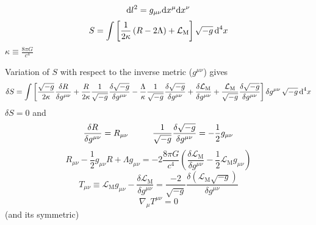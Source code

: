 \begin{equation}
	\text{d} l^2=g_{\mu\nu}\text{d} x^\mu\text{d} x^\nu
\end{equation}
\begin{equation}
	S=\int\left[\frac{1}{2\kappa}\left(R-2\Lambda\right)+\mathcal{L}_{\text{M}}\right]\sqrt{-g}\,\text{d}^4 x
\end{equation}
$\kappa\equiv\frac{8\pi G}{c^4}$

Variation of $S$ with respect to the inverse metric ($g^{\mu\nu}$) gives
\begin{multline}
	\delta S=\int \left[\frac{\sqrt{-g}}{2\kappa}\frac{\delta R}{\delta g^{\mu\nu}}+\frac{R}{2\kappa}\frac{1}{\sqrt{-g}}\frac{\delta \sqrt{-g}}{\delta g^{\mu\nu}}-\frac{\Lambda}{\kappa}\frac{1}{\sqrt{-g}}\frac{\delta\sqrt{-g}}{\delta g^{\mu\nu}}+\frac{\delta\mathcal{L}_{\text{M}}}{\delta g^{\mu\nu}}+\frac{\mathcal{L}_{\text{M}}}{\sqrt{-g}}\frac{\delta\sqrt{-g}}{\delta g^{\mu\nu}}\right]\delta g^{\mu\nu}\,\sqrt{-g}\,\text{d}^4x
\end{multline}
$\delta S=0$ and
\begin{equation}
	\frac{\delta R}{\delta g^{\mu\nu}}=R_{\mu\nu}\hspace{1.0cm}\frac{1}{\sqrt{-g}}\frac{\delta\sqrt{-g}}{\delta g^{\mu\nu}}=-\frac{1}{2}g_{\mu\nu}
\end{equation}
\begin{equation}
	R_{\mu\nu}-\frac{1}{2}g_{\mu\nu}R+\Lambda g_{\mu\nu}=-2\frac{8\pi G}{c^4}\left(\frac{\delta\mathcal{L}_{\text{M}}}{\delta g^{\mu\nu}}-\frac{1}{2}\mathcal{L}_{\text{M}}g_{\mu\nu}\right)
\end{equation}
\begin{equation}
	T_{\mu\nu}\equiv \mathcal{L}_{\text{M}}g_{\mu\nu}-\frac{\delta\mathcal{L}_{\text{M}}}{\delta g^{\mu\nu}}=\frac{-2}{\sqrt{-g}}\frac{\delta \left(\mathcal{L}_{\text{M}}\sqrt{-g}\right)}{\delta g^{\mu\nu}}
\end{equation}
\cite{Energy-MomentumTensor}
\begin{equation}
	\nabla_\mu T^{\mu\nu}=0
\end{equation}
(and its symmetric)
